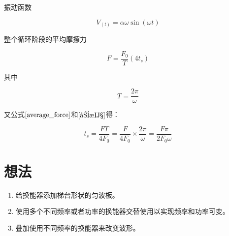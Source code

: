 \documentclass[zihao=5,UTF8,fontset=windows]{ctexart}
\begin{document}
振动函数

\[V_{(t)}=\alpha \omega \sin ( \omega t) \tag{2-1}\label{振动函数}\]

整个循环阶段的平均摩擦力

\[F = \frac{F_0}{T}(4t_s) \tag{2-2}\label{average_force}\]

其中

\[T=\frac{2\pi}{\omega} \tag{2-3}\label{周期}\]

又公式$\eqref{average_force}$和$\eqref{周期}$得：

\[t_s=\frac{FT}{4F_0}=\frac{F}{4F_0}\times\frac{2\pi}{\omega}=\frac{F\pi}{2F_0\omega} \tag{2-4}\]

\section{想法}

\begin{enumerate}
	\item 给换能器添加梯台形状的匀波板。
	\item 使用多个不同频率或者功率的换能器交替使用以实现频率和功率可变。
	\item 叠加使用不同频率的换能器来改变波形。
\end{enumerate}
\end{document}
